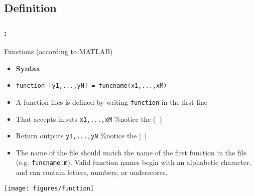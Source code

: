 \documentclass[11pt]{beamer}
\begin{document}
\subsection{Definition}
\begin{frame}[fragile]
	
	\frametitle{\secname : \subsecname}
	\vspace{-1pt}
	\begin{exampleblock}{Functions (according to MATLAB)}
		\begin{itemize}
			\item[] \textbf{Syntax}			
			\item[] \verb|function [y1,...,yN] = funcname(x1,...,xM)|
			\item A function files is defined by writing \verb|function| in the first line
			\item That accepts inputs \verb|x1,...,xM| \phantom{123}\%notice the (~)
			\item Return outputs \verb|y1,...,yN| \phantom{1235678}\%notice the [~]
			\item The name of the file should match the name of the first function in the file (e.g. \verb|funcname.m|). Valid function names begin with an alphabetic character, and can contain letters, numbers, or underscores.			
		\end{itemize}
	\end{exampleblock}
	\vspace{-2mm}
	\begin{center}
	\texttt{[image: figures/function]}
	\end{center}
	
\end{frame}
\end{document}
